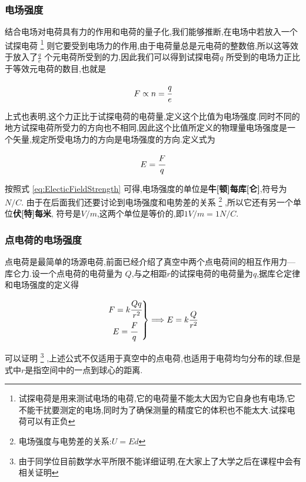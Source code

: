 \subsubsection{电场强度}

结合电场对电荷具有力的作用和电荷的量子化,我们能够推断,在电场中若放入一个试探电荷
\footnote{试探电荷是用来测试电场的电荷,它的电荷量不能太大因为它自身也有电场,它不能干扰要测定的电场,同时为了确保测量的精度它的体积也不能太大.试探电荷可以有正负}
则它要受到电场力的作用,由于电荷量总是元电荷的整数倍,所以这等效于放入了$\frac{q}{e}$ 个元电荷所受到的力,因此我们可以得到试探电荷$q$ 所受到的电场力正比于等效元电荷的数目,也就是

\[
  F\propto n=\cfrac{q}{e}
\]

上式也表明,这个力正比于试探电荷的电荷量,定义这个比值为电场强度.同时不同的地方试探电荷所受力的方向也不相同,因此这个比值所定义的物理量电场强度是一个矢量,规定所受电场力的方向是电场强度的方向.定义式为

\begin{equation}
  E=\cfrac{F}{q}
  \label{eq:ElecticFieldStrength}
\end{equation}


按照式 \eqref{eq:ElecticFieldStrength} 可得,电场强度的单位是{\bf 牛[顿]每库[仑]},符号为 $N/C$. 由于在后面我们还要讨论到电场强度和电势差的关系
\footnote{电场强度与电势差的关系:$U=Ed$}
,所以它还有另一个单位{\bf 伏[特]每米}, 符号是$V/m$,这两个单位是等价的,即$1V/m=1N/C$.

\subsubsection{点电荷的电场强度}

点电荷是最简单的场源电荷,前面已经介绍了真空中两个点电荷间的相互作用力---库仑力.设一个点电荷的电荷量为 $Q$,与之相距$r$的试探电荷的电荷量为$q$,据库仑定律和电场强度的定义得

\begin{equation}
  \left.
  \begin{gathered}
    F=k\cfrac{Qq}{r^2}\\
    E=\cfrac{F}{q}
  \end{gathered}
\right \}
\Longrightarrow
E=k\frac{Q}{r^2}
  \label{eq:EFSpoint}
\end{equation}

可以证明
\footnote{由于同学位目前数学水平所限不能详细证明,在大家上了大学之后在课程中会有相关证明}
,上述公式不仅适用于真空中的点电荷,也适用于电荷均匀分布的球,但是式中$r$是指空间中的一点到球心的距离.

